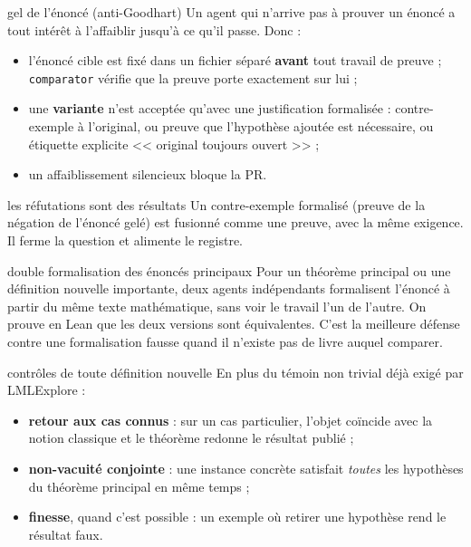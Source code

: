 \documentclass[11pt,a4paper]{article}
\newcommand{\lmlx}{\textsf{LMLExplore}}
\begin{document}
\begin{regle}{gel de l'énoncé (anti-Goodhart)}
Un agent qui n'arrive pas à prouver un énoncé a tout intérêt à l'affaiblir jusqu'à ce qu'il passe.
Donc :
\begin{itemize}
\item l'énoncé cible est fixé dans un fichier séparé \textbf{avant} tout travail de preuve ;
  \texttt{comparator} vérifie que la preuve porte exactement sur lui ;
\item une \textbf{variante} n'est acceptée qu'avec une justification formalisée : contre-exemple à
  l'original, ou preuve que l'hypothèse ajoutée est nécessaire, ou étiquette explicite
  << original toujours ouvert >> ;
\item un affaiblissement silencieux bloque la PR.
\end{itemize}
\end{regle}

\begin{regle}{les réfutations sont des résultats}
Un contre-exemple formalisé (preuve de la négation de l'énoncé gelé) est fusionné comme une preuve,
avec la même exigence. Il ferme la question et alimente le registre.
\end{regle}

\begin{regle}{double formalisation des énoncés principaux}
Pour un théorème principal ou une définition nouvelle importante, deux agents indépendants
formalisent l'énoncé à partir du même texte mathématique, sans voir le travail l'un de l'autre.
On prouve en Lean que les deux versions sont équivalentes. C'est la meilleure défense contre une
formalisation fausse quand il n'existe pas de livre auquel comparer.
\end{regle}

\begin{regle}{contrôles de toute définition nouvelle}
En plus du témoin non trivial déjà exigé par \lmlx{} :
\begin{itemize}
\item \textbf{retour aux cas connus} : sur un cas particulier, l'objet coïncide avec la notion classique
  et le théorème redonne le résultat publié ;
\item \textbf{non-vacuité conjointe} : une instance concrète satisfait \emph{toutes} les hypothèses du
  théorème principal en même temps ;
\item \textbf{finesse}, quand c'est possible : un exemple où retirer une hypothèse rend le résultat faux.
\end{itemize}
\end{regle}
\end{document}
